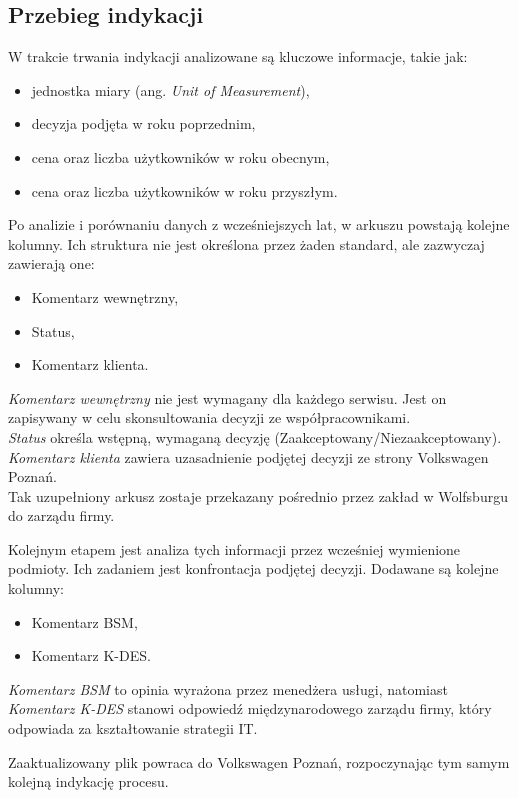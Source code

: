 \subsection{Przebieg indykacji}
W trakcie trwania indykacji analizowane są kluczowe informacje, takie jak:
\begin{itemize}
    \item jednostka miary (ang. \emph{Unit of Measurement}),
    \item decyzja podjęta w roku poprzednim,
    \item cena oraz liczba użytkowników w roku obecnym,
    \item cena oraz liczba użytkowników w roku przyszłym.
\end{itemize}
Po analizie i porównaniu danych z wcześniejszych lat, w arkuszu powstają kolejne kolumny. Ich struktura nie jest określona przez żaden standard, ale zazwyczaj zawierają one:
\begin{itemize}
    \item Komentarz wewnętrzny,
    \item Status,
    \item Komentarz klienta.
\end{itemize}

\noindent\emph{Komentarz wewnętrzny} nie jest wymagany dla każdego serwisu. Jest on zapisywany w celu skonsultowania decyzji ze współpracownikami.\\ 
\emph{Status} określa wstępną, wymaganą decyzję (Zaakceptowany/Niezaakceptowany).\\ 
\emph{Komentarz klienta} zawiera uzasadnienie podjętej decyzji ze strony Volkswagen Poznań.\\
Tak uzupełniony arkusz zostaje przekazany pośrednio przez zakład w Wolfsburgu do zarządu firmy. \par

Kolejnym etapem jest analiza tych informacji przez wcześniej wymienione podmioty. Ich zadaniem jest konfrontacja podjętej decyzji. Dodawane są kolejne kolumny:
\begin{itemize}
    \item Komentarz BSM,
    \item Komentarz K-DES.
\end{itemize}

\noindent\emph{Komentarz BSM} to opinia wyrażona przez menedżera usługi, natomiast \emph{Komentarz K-DES} stanowi odpowiedź międzynarodowego zarządu firmy, który odpowiada za kształtowanie strategii IT.\par
Zaaktualizowany plik powraca do Volkswagen Poznań, rozpoczynając tym samym kolejną indykację procesu.





